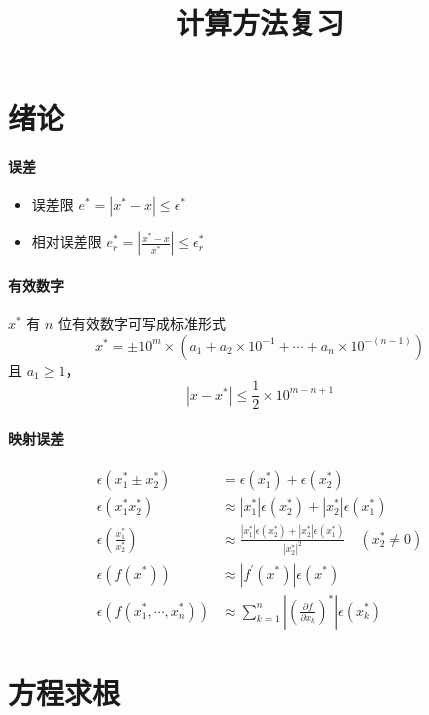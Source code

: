 \documentclass[twocolumn]{ctexart}
\title{计算方法复习}
\date{}
\begin{document}
\maketitle


\section{绪论}
\paragraph{误差}
\begin{itemize}
    \item 误差限 $e^*=|x^*-x|\leq \epsilon^*$
    \item 相对误差限 $e_r^*=\left|\frac{x^*-x}{x^*}\right|\leq \epsilon_r^*$
\end{itemize}
\paragraph{有效数字} $x^*$ 有 $n$ 位有效数字可写成标准形式
\begin{equation*}
    x^*=\pm 10^m\times (a_1+a_2\times 10^{-1}+\cdots+a_n\times 10^{-(n-1)})
\end{equation*}
且 $a_1\geq 1$，
\begin{equation*}
    |x-x^*|\leq \frac{1}{2}\times 10^{m-n+1}
\end{equation*}
\paragraph{映射误差}
\begin{align*}
    \epsilon(x_1^*\pm x_2^*)&=\epsilon(x_1^*)+\epsilon(x_2^*)\\
    \epsilon(x_1^*x_2^*)&\approx |x_1^*|\epsilon(x_2^*)+|x_2^*|\epsilon(x_1^*)\\
    \epsilon\left(\frac{x_1^*}{x_2^*}\right)&\approx \frac{|x_1^*|\epsilon(x_2^*)+|x_2^*|\epsilon(x_1^*)}{|x_2^*|^2}\quad (x_2^*\neq 0)\\
    \epsilon(f(x^*))&\approx |f^\prime (x^*)|\epsilon(x^*)\\
    \epsilon(f(x_1^*,\cdots,x_n^*))&\approx \sum_{k=1}^n\left|\left(\frac{\partial f}{\partial x_k}\right)^*\right|\epsilon(x_k^*)
\end{align*}

\section{方程求根}
\end{document}
